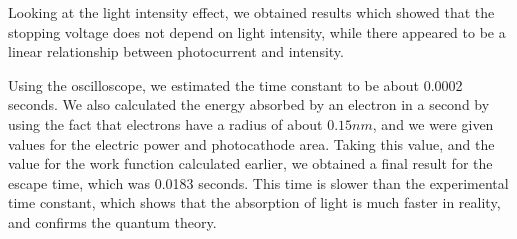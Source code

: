 \documentclass[a4paper, 11pt]{article}
\begin{document}
Looking at the light intensity effect, we obtained results which showed that the stopping voltage does not depend on light intensity, while there appeared to be a linear relationship between photocurrent and intensity.

Using the oscilloscope, we estimated the time constant to be about 0.0002 seconds. We also calculated the energy absorbed by an electron in a second by using the fact that electrons have a radius of about $0.15nm$, and we were given values for the electric power and photocathode area. Taking this value, and the value for the work function calculated earlier, we obtained a final result for the escape time, which was 0.0183 seconds. This time is slower than the experimental time constant, which shows that the absorption of light is much faster in reality, and confirms the quantum theory.
\end{document}
